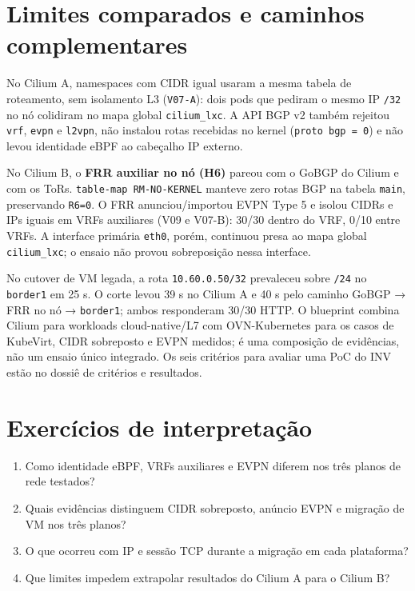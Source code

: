 \documentclass[12pt,openany,oneside,a4paper,chapter=TITLE,english,brazil]{abntex2}
\providecommand{\tightlist}{\setlength{\itemsep}{0pt}\setlength{\parskip}{0pt}}
\begin{document}
\section{Limites comparados e caminhos complementares}\label{limites-comparados-e-caminhos-complementares}

No Cilium A, namespaces com CIDR igual usaram a mesma tabela de roteamento, sem isolamento L3 (\texttt{V07-{}\allowbreak{}A}): dois pods que pediram o mesmo IP \texttt{/\allowbreak{}32} no nó colidiram no mapa global \texttt{cilium\_\allowbreak{}lxc}. A API BGP v2 também rejeitou \texttt{vrf}, \texttt{evpn} e \texttt{l2vpn}, não instalou rotas recebidas no kernel (\texttt{proto bgp =\allowbreak{} 0}) e não levou identidade eBPF ao cabeçalho IP externo.

No Cilium B, o \textbf{FRR auxiliar no nó (H6)} pareou com o GoBGP do Cilium e com os ToRs. \texttt{table-{}\allowbreak{}map RM-{}\allowbreak{}NO-{}\allowbreak{}KERNEL} manteve zero rotas BGP na tabela \texttt{main}, preservando \texttt{R6=\allowbreak{}0}. O FRR anunciou/importou EVPN Type 5 e isolou CIDRs e IPs iguais em VRFs auxiliares (V09 e V07-B): 30/30 dentro do VRF, 0/10 entre VRFs. A interface primária \texttt{eth0}, porém, continuou presa ao mapa global \texttt{cilium\_\allowbreak{}lxc}; o ensaio não provou sobreposição nessa interface.

No cutover de VM legada, a rota \texttt{10.\allowbreak{}60.\allowbreak{}0.\allowbreak{}50/\allowbreak{}32} prevaleceu sobre \texttt{/\allowbreak{}24} no \texttt{border1} em 25 s. O corte levou 39 s no Cilium A e 40 s pelo caminho GoBGP → FRR no nó → \texttt{border1}; ambos responderam 30/30 HTTP. O blueprint combina Cilium para workloads cloud-native/L7 com OVN-Kubernetes para os casos de KubeVirt, CIDR sobreposto e EVPN medidos; é uma composição de evidências, não um ensaio único integrado. Os seis critérios para avaliar uma PoC do INV estão no dossiê de critérios e resultados.

\section{Exercícios de interpretação}\label{exercuxedcios-de-interpretauxe7uxe3o}

\begin{enumerate}
\def\labelenumi{\arabic{enumi}.}
\tightlist
\item
  Como identidade eBPF, VRFs auxiliares e EVPN diferem nos três planos de rede testados?
\item
  Quais evidências distinguem CIDR sobreposto, anúncio EVPN e migração de VM nos três planos?
\item
  O que ocorreu com IP e sessão TCP durante a migração em cada plataforma?
\item
  Que limites impedem extrapolar resultados do Cilium A para o Cilium B?
\end{enumerate}
\end{document}
